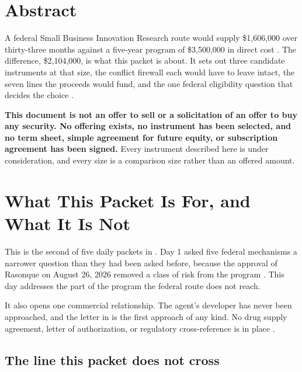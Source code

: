 \section*{Abstract}

A federal Small Business Innovation Research route would supply \$1,606,000 over
thirty-three months against a five-year program of \$3,500,000 in direct cost
\cite{capitalplan2026,tenapps2026}. The difference, \$2,104,000, is what this
packet is about. It sets out three candidate instruments at that size, the
conflict firewall each would have to leave intact, the seven lines the proceeds
would fund, and the one federal eligibility question that decides the choice
\cite{ecfr2026sbirownership}.

\textbf{This document is not an offer to sell or a solicitation of an offer to
buy any security. No offering exists, no instrument has been selected, and no
term sheet, simple agreement for future equity, or subscription agreement has
been signed.} Every instrument described here is under consideration, and every
size is a comparison size rather than an offered amount.

\section{What This Packet Is For, and What It Is Not}

This is the second of five daily packets in
. Day 1 asked five federal mechanisms a narrower
question than they had been asked before, because the approval of Rasonque on
August 26, 2026 removed a class of risk from the program \cite{fdarasonque2026}.
This day addresses the part of the program the federal route does not reach.

It also opens one commercial relationship. The agent's developer has never been
approached, and the letter in  is the
first approach of any kind. No drug supply agreement, letter of authorization, or
regulatory cross-reference is in place \cite{revmedexternal2026}.

\subsection{The line this packet does not cross}

